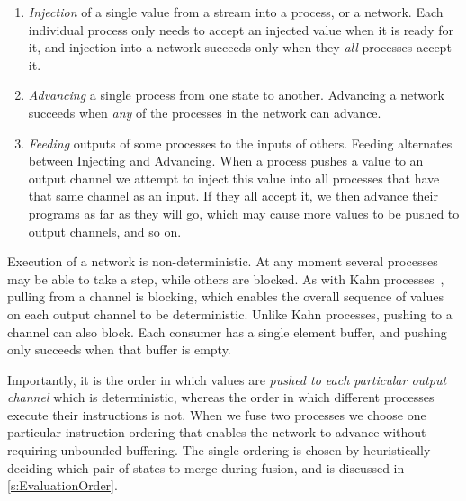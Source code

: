 \begin{enumerate}
\item \emph{Injection} of a single value from a stream into a process, or a network.
  Each individual process only needs to accept an injected value when it is ready for it, and injection into a network succeeds only when they \emph{all} processes accept it.

\item \emph{Advancing} a single process from one state to another.
  Advancing a network succeeds when \emph{any} of the processes in the network can advance.

\item \emph{Feeding} outputs of some processes to the inputs of others.
  Feeding alternates between Injecting and Advancing.
    When a process pushes a value to an output channel we attempt to inject this value into all processes that have that same channel as an input.
    If they all accept it, we then advance their programs as far as they will go, which may cause more values to be pushed to output channels, and so on.
\end{enumerate}

Execution of a network is non-deterministic.
At any moment several processes may be able to take a step, while others are blocked.
As with Kahn processes~\cite{kahn1976coroutines}, pulling from a channel is blocking, which enables the overall sequence of values on each output channel to be deterministic.
Unlike Kahn processes, pushing to a channel can also block.
Each consumer has a single element buffer, and pushing only succeeds when that buffer is empty.


Importantly, it is the order in which values are \emph{pushed to each particular output channel} which is deterministic, whereas the order in which different processes execute their instructions is not.
When we fuse two processes we choose one particular instruction ordering that enables the network to advance without requiring unbounded buffering.
The single ordering is chosen by heuristically deciding which pair of states to merge during fusion, and is discussed in \autoref{s:EvaluationOrder}.

